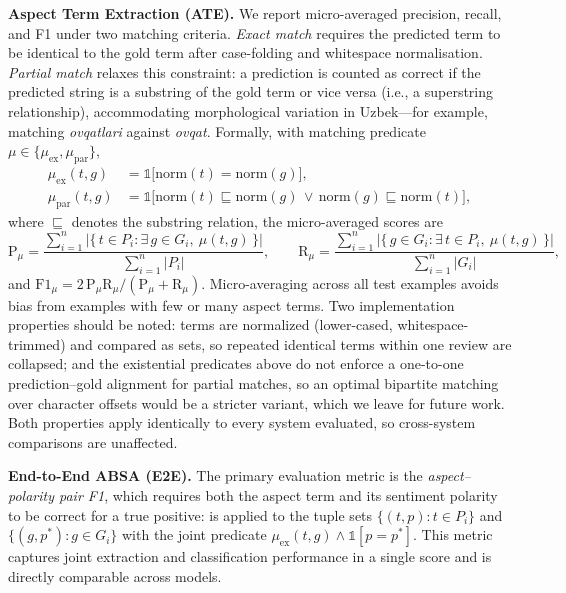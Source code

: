 \documentclass[bdcc,article,submit,moreauthors]{Definitions/mdpi}
\newcommand{\ind}{\mathds{1}} %
\begin{document}
\textbf{Aspect Term Extraction (ATE).} We report micro-averaged precision, recall, and F1 under two matching criteria. \emph{Exact match} requires the predicted term to be identical to the gold term after case-folding and whitespace normalisation. \emph{Partial match} relaxes this constraint: a prediction is counted as correct if the predicted string is a substring of the gold term or vice versa (i.e., a superstring relationship), accommodating morphological variation in Uzbek---for example, matching \textit{ovqatlari} against \textit{ovqat}. Formally, with matching predicate $\mu \in \{\mu_{\mathrm{ex}}, \mu_{\mathrm{par}}\}$,
\begin{align}
\mu_{\mathrm{ex}}(t, g) &= \ind\big[\mathrm{norm}(t) = \mathrm{norm}(g)\big], \label{eq:match_ex}\\
\mu_{\mathrm{par}}(t, g) &= \ind\big[\mathrm{norm}(t) \sqsubseteq \mathrm{norm}(g) \,\vee\, \mathrm{norm}(g) \sqsubseteq \mathrm{norm}(t)\big], \label{eq:match}
\end{align}
where $\sqsubseteq$ denotes the substring relation, the micro-averaged scores are
\begin{equation}
\label{eq:ate}
\mathrm{P}_\mu = \frac{\sum_{i=1}^{n} |\{\, t \in P_i : \exists\, g \in G_i,\ \mu(t,g) \,\}|}{\sum_{i=1}^{n} |P_i|},
\qquad
\mathrm{R}_\mu = \frac{\sum_{i=1}^{n} |\{\, g \in G_i : \exists\, t \in P_i,\ \mu(t,g) \,\}|}{\sum_{i=1}^{n} |G_i|},
\end{equation}
and $\mathrm{F1}_\mu = 2\,\mathrm{P}_\mu \mathrm{R}_\mu / (\mathrm{P}_\mu + \mathrm{R}_\mu)$. Micro-averaging across all test examples avoids bias from examples with few or many aspect terms. Two implementation properties should be noted: terms are normalized (lower-cased, whitespace-trimmed) and compared as sets, so repeated identical terms within one review are collapsed; and the existential predicates above do not enforce a one-to-one prediction--gold alignment for partial matches, so an optimal bipartite matching over character offsets would be a stricter variant, which we leave for future work. Both properties apply identically to every system evaluated, so cross-system comparisons are unaffected.

\textbf{End-to-End ABSA (E2E).} The primary evaluation metric is the \emph{aspect--polarity pair F1}, which requires both the aspect term and its sentiment polarity to be correct for a true positive:  is applied to the tuple sets $\{(t, p) : t \in P_i\}$ and $\{(g, p^{*}) : g \in G_i\}$ with the joint predicate $\mu_{\mathrm{ex}}(t,g) \wedge \ind[p = p^{*}]$. This metric captures joint extraction and classification performance in a single score and is directly comparable across models.
\end{document}
